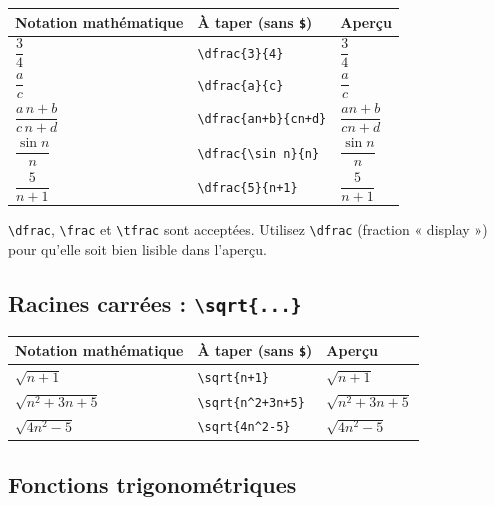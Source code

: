 \documentclass[11pt,a4paper]{article}
\begin{document}
\begin{center}
\renewcommand{\arraystretch}{1.35}
\footnotesize
\begin{tabular}{@{}p{4.2cm}p{6.0cm}p{4.0cm}@{}}
\toprule
\textbf{Notation mathématique} & \textbf{À taper (sans \texttt{\$})} & \textbf{Aperçu} \\
\midrule
\(\dfrac{3}{4}\)               & \verb|\dfrac{3}{4}|            & \(\dfrac{3}{4}\) \\
\(\dfrac{a}{c}\)              & \verb|\dfrac{a}{c}|            & \(\dfrac{a}{c}\) \\
\(\dfrac{a\,n+b}{c\,n+d}\)    & \verb|\dfrac{an+b}{cn+d}|      & \(\dfrac{an+b}{cn+d}\) \\
\(\dfrac{\sin n}{n}\)         & \verb|\dfrac{\sin n}{n}|       & \(\dfrac{\sin n}{n}\) \\
\(\dfrac{5}{n+1}\)            & \verb|\dfrac{5}{n+1}|          & \(\dfrac{5}{n+1}\) \\
\bottomrule
\end{tabular}
\end{center}

\begin{astuce}
\verb|\dfrac|, \verb|\frac| et \verb|\tfrac| sont acceptées. Utilisez
\verb|\dfrac| (fraction « display ») pour qu'elle soit bien lisible dans
l'aperçu.
\end{astuce}

\subsection{Racines carrées : \texttt{\textbackslash sqrt\{...\}}}

\begin{center}
\renewcommand{\arraystretch}{1.35}
\footnotesize
\begin{tabular}{@{}p{4.2cm}p{6.0cm}p{4.0cm}@{}}
\toprule
\textbf{Notation mathématique} & \textbf{À taper (sans \texttt{\$})} & \textbf{Aperçu} \\
\midrule
\(\sqrt{n+1}\)          & \verb|\sqrt{n+1}|            & \(\sqrt{n+1}\) \\
\(\sqrt{n^2 + 3n + 5}\) & \verb|\sqrt{n^2+3n+5}|       & \(\sqrt{n^2+3n+5}\) \\
\(\sqrt{4n^2 - 5}\)     & \verb|\sqrt{4n^2-5}|         & \(\sqrt{4n^2-5}\) \\
\bottomrule
\end{tabular}
\end{center}

\subsection{Fonctions trigonométriques}
\end{document}
